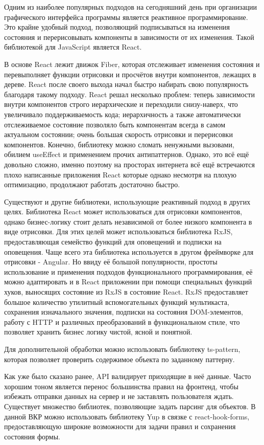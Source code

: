 \documentclass[14pt]{extarticle}
\begin{document}
Одним из наиболее популярных подходов на сегодняшний день при организации графического интерфейса программы является
реактивное программирование. Это крайне удобный подход, позволяющий подписываться на изменения состояния и перерисовывать
компоненты в зависимости от их изменения. Такой библиотекой для JavaScript является React.

В основе React лежит движок Fiber, которая отслеживает изменения состояния и перевыполняет функции отрисовки
и просчётов внутри компонентов, лежащих в дереве. React после своего выхода начал быстро набирать свою популярность
благодаря такому подходу. React решал несколько проблем: теперь зависимости внутри компонентов строго иерархические и 
переходили снизу-наверх, что увеличивало поддерживаемость кода; иерархичность а также автоматически отслеживаемое состояние
позволяло быть компонентам всегда в самом актуальном состоянии; очень большая скорость отрисовки и перерисовки компонентов.
Конечно, библиотеку можно сломать ненужными вызовами, обилием useEffect и применением прочих антипаттернов. Однако, это 
всё ещё довольно сложно, именно поэтому на просторах интернета всё ещё встречаются плохо написанные приложения React 
которые однако несмотря на плохую оптимизацию, продолжают работать достаточно быстро.

Существуют и другие библиотеки, использующие реактивный подход в других целях. Библиотека React может использоваться
для отрисовки компонентов, однако бизнес-логику стоит делать независимой от более низкого компонента в виде отрисовки.
Для этих целей может использоваться библиотека RxJS, предоставляющая семейство функций для оповещений и подписки
на оповещения. Чаще всего эта библиотека используется в другом фреймворке для отрисовки - Angular. Но ввиду
её большой популярности, простоты использование и применения подходов функционального программирования, её
можно адаптировать и в React приложении при помощи специальных функций хуков, выносящих состояние из RxJS в состояние
React. RxJS предоставляет большое количество утилитный вспомогательных функций мультикаста, сохранения изначального значения, 
подписки на состояния DOM-элементов, работу с HTTP и различных преобразований в функциональном стиле, что позволяет хранить
бизнес логику чистой, ясной и понятной.

Для дополнительной обработки можно использовать библиотеку ts-pattern, которая позволяет проверить
содержимое объекта по заданному паттерну.

Как уже было сказано ранее, API валидирует приходящие в неё данные. Часто хорошим тоном является перенос большинства
правил на фронтенд, чтобы избежать отправки данных на сервер и не заставлять пользователя ждать. Существует множество
библиотек, позволяющие задать парсинг для объектов. В данной ВКР можно использовать библиотеку Yup в связке с react-hook-forms, 
предоставляющую широкие возможности для задачи правил и сохранения состояния формы.
\end{document}

